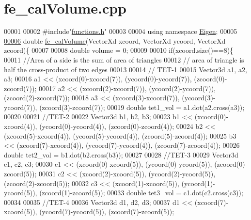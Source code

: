 \hypertarget{fe__cal_volume_8cpp_source}{}\section{fe\+\_\+cal\+Volume.\+cpp}
\label{fe__cal_volume_8cpp_source}

\begin{DoxyCode}
00001 
00002 \textcolor{preprocessor}{#include"\hyperlink{functions_8h}{functions.h}"}
00003 
00004 \textcolor{keyword}{using namespace }\hyperlink{namespace_eigen}{Eigen};
00005 
\hyperlink{fe__cal_volume_8cpp_a00f586c9a4bc56ec486776402fc26605}{00006} \textcolor{keywordtype}{double} \hyperlink{fe__cal_volume_8cpp_a00f586c9a4bc56ec486776402fc26605}{fe\_calVolume}(VectorXd xcoord, VectorXd ycoord, VectorXd zcoord)\{
00007 
00008 \textcolor{keywordtype}{double} volume = 0;
00009 
00010 \textcolor{keywordflow}{if}(xcoord.size()==8)\{
00011     \textcolor{comment}{//Area of a side is the sum of area of triangles}
00012     \textcolor{comment}{// area of triangle is half the cross-product of two edges}
00013 
00014     \textcolor{comment}{// TET-1}
00015     Vector3d a1, a2, a3;
00016     a1 << (xcoord(0)-xcoord(7)), (ycoord(0)-ycoord(7)), (zcoord(0)-zcoord(7));
00017     a2 << (xcoord(2)-xcoord(7)), (ycoord(2)-ycoord(7)), (zcoord(2)-zcoord(7));
00018     a3 << (xcoord(3)-xcoord(7)), (ycoord(3)-ycoord(7)), (zcoord(3)-zcoord(7));
00019     \textcolor{keywordtype}{double} tet1\_vol = a1.dot(a2.cross(a3));
00020 
00021     \textcolor{comment}{//TET-2}
00022     Vector3d b1, b2, b3;
00023     b1 << (xcoord(0)-xcoord(4)), (ycoord(0)-ycoord(4)), (zcoord(0)-zcoord(4));
00024     b2 << (xcoord(5)-xcoord(4)), (ycoord(5)-ycoord(4)), (zcoord(5)-zcoord(4));
00025     b3 << (xcoord(7)-xcoord(4)), (ycoord(7)-ycoord(4)), (zcoord(7)-zcoord(4));
00026     \textcolor{keywordtype}{double} tet2\_vol = b1.dot(b2.cross(b3));
00027 
00028     \textcolor{comment}{//TET-3}
00029     Vector3d c1, c2, c3;
00030     c1 << (xcoord(0)-xcoord(5)), (ycoord(0)-ycoord(5)), (zcoord(0)-zcoord(5));
00031     c2 << (xcoord(2)-xcoord(5)), (ycoord(2)-ycoord(5)), (zcoord(2)-zcoord(5));
00032     c3 << (xcoord(1)-xcoord(5)), (ycoord(1)-ycoord(5)), (zcoord(1)-zcoord(5));
00033     \textcolor{keywordtype}{double} tet3\_vol = c1.dot(c2.cross(c3));
00034 
00035     \textcolor{comment}{//TET-4}
00036     Vector3d d1, d2, d3;
00037     d1 << (xcoord(7)-xcoord(5)), (ycoord(7)-ycoord(5)), (zcoord(7)-zcoord(5));

\end{DoxyCode}
